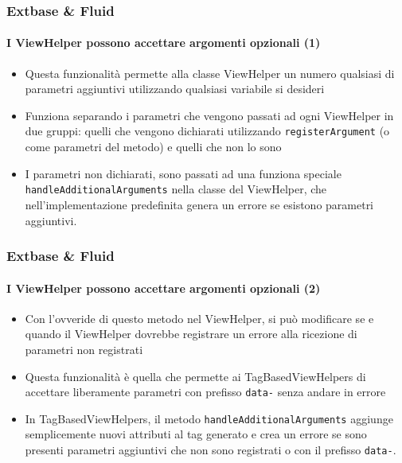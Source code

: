 \begin{frame}[fragile]
	\frametitle{Extbase \& Fluid}
	\framesubtitle{I ViewHelper possono accettare argomenti opzionali (1)}

	\begin{itemize}

		\item Questa funzionalità permette alla classe ViewHelper un numero qualsiasi di parametri
			aggiuntivi utilizzando qualsiasi variabile si desideri

		\item Funziona separando i parametri che vengono passati ad ogni ViewHelper in due
			gruppi: quelli che vengono dichiarati utilizzando \texttt{registerArgument}
			(o come parametri del metodo) e quelli che non lo sono

		\item I parametri non dichiarati, sono passati ad una funziona speciale
			\texttt{handleAdditionalArguments}
			nella classe del ViewHelper, che nell'implementazione predefinita genera un errore
			se esistono parametri aggiuntivi.

	\end{itemize}

\end{frame}


\begin{frame}[fragile]
	\frametitle{Extbase \& Fluid}
	\framesubtitle{I ViewHelper possono accettare argomenti opzionali (2)}

	\begin{itemize}

		\item Con l'ovveride di questo metodo nel ViewHelper, si può modificare se e quando
			il ViewHelper dovrebbe registrare un errore alla ricezione di parametri non registrati

		\item Questa funzionalità è quella che permette ai TagBasedViewHelpers di accettare liberamente
			parametri con prefisso \texttt{data-} senza andare in errore

		\item In TagBasedViewHelpers, il metodo \texttt{handleAdditionalArguments} 
			aggiunge semplicemente nuovi attributi al tag generato e crea un errore
			se sono presenti parametri aggiuntivi che non sono registrati o 
			con il prefisso \texttt{data-}.

	\end{itemize}

\end{frame}

